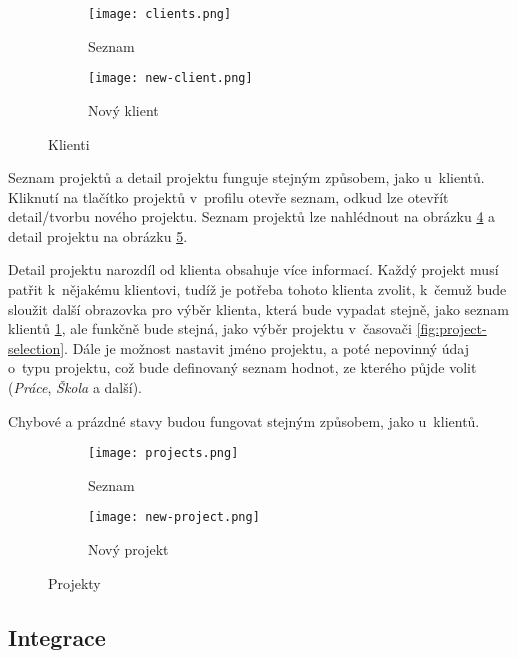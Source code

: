 \begin{figure}[h]
    \centering
    \begin{subfigure}[b]{0.4\textwidth}
		\centering
		\texttt{[image: clients.png]}
		\caption{Seznam}
		\label{fig:client-list}
	\end{subfigure}
	\hspace{2cm}
	\begin{subfigure}[b]{0.4\textwidth}
		\centering
		\texttt{[image: new-client.png]}
		\caption{Nový klient}
		\label{fig:new-client}
	\end{subfigure}
	\caption{Klienti}
	\label{fig:clients}
\end{figure}

Seznam projektů a detail projektu funguje stejným způsobem, jako u~klientů. Kliknutí na tlačítko projektů v~profilu otevře seznam, odkud lze otevřít detail/tvorbu nového projektu. Seznam projektů lze nahlédnout na obrázku \ref{fig:project-list} a detail projektu na obrázku \ref{fig:new-project}.

Detail projektu narozdíl od klienta obsahuje více informací. Každý projekt musí patřit k~nějakému klientovi, tudíž je potřeba tohoto klienta zvolit, k~čemuž bude sloužit další obrazovka pro výběr klienta, která bude vypadat stejně, jako seznam klientů \ref{fig:client-list}, ale funkčně bude stejná, jako výběr projektu v~časovači \ref{fig:project-selection}. Dále je možnost nastavit jméno projektu, a poté nepovinný údaj o~typu projektu, což bude definovaný seznam hodnot, ze kterého půjde volit (\emph{Práce}, \emph{Škola} a další).

Chybové a prázdné stavy budou fungovat stejným způsobem, jako u~klientů.

\begin{figure}[h]
    \centering
    \begin{subfigure}[b]{0.4\textwidth}
		\centering
		\texttt{[image: projects.png]}
		\caption{Seznam}
		\label{fig:project-list}
	\end{subfigure}
	\hspace{2cm}
	\begin{subfigure}[b]{0.4\textwidth}
		\centering
		\texttt{[image: new-project.png]}
		\caption{Nový projekt}
		\label{fig:new-project}
	\end{subfigure}
	\caption{Projekty}
	\label{fig:projects}
\end{figure}

\subsection{Integrace}

